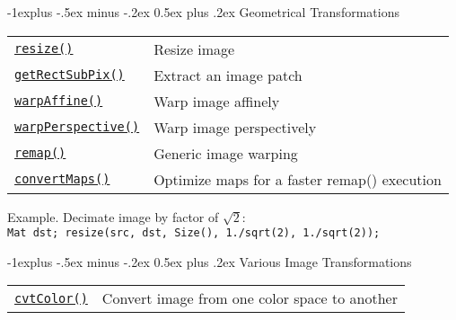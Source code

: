 \documentclass[10pt,landscape]{article}
\makeatletter
\renewcommand{\subsection}{\@startsection{subsection}{2}{0mm}%
                                {-1explus -.5ex minus -.2ex}%
                                {0.5ex plus .2ex}%
                                {\normalfont\normalsize\bfseries}}
\makeatother
\begin{document}
\begin{multicols}{3}
\subsection{Geometrical Transformations}

\begin{tabular}{@{}p{\the\MyLen}%
                @{}p{\linewidth-\the\MyLen}@{}}
\texttt{\href{http://docs.opencv.org/modules/imgproc/doc/geometric_transformations.html\#resize}{resize()}} & Resize image \\

\texttt{\href{http://docs.opencv.org/modules/imgproc/doc/geometric_transformations.html\#getrectsubpix}{getRectSubPix()}} & Extract an image patch \\

\texttt{\href{http://docs.opencv.org/modules/imgproc/doc/geometric_transformations.html\#warpaffine}{warpAffine()}} & Warp image affinely\\

\texttt{\href{http://docs.opencv.org/modules/imgproc/doc/geometric_transformations.html\#warpperspective}{warpPerspective()}} & Warp image perspectively\\

\texttt{\href{http://docs.opencv.org/modules/imgproc/doc/geometric_transformations.html\#remap}{remap()}} & Generic image warping\\

\texttt{\href{http://docs.opencv.org/modules/imgproc/doc/geometric_transformations.html\#convertmaps}{convertMaps()}} & Optimize maps for a faster remap() execution\\

\end{tabular}

\begin{tabbing}
Example. Decimate image by factor of $\sqrt{2}$:\\
\texttt{Mat dst; resize(src, dst, Size(), 1./sqrt(2), 1./sqrt(2));}
\end{tabbing}

\subsection{Various Image Transformations}

\begin{tabular}{@{}p{\the\MyLen}%
                @{}p{\linewidth-\the\MyLen}@{}}

\texttt{\href{http://docs.opencv.org/modules/imgproc/doc/miscellaneous_transformations.html\#cvtcolor}{cvtColor()}} & Convert image from one color space to another \\


\end{tabular}
\end{multicols}
\end{document}
